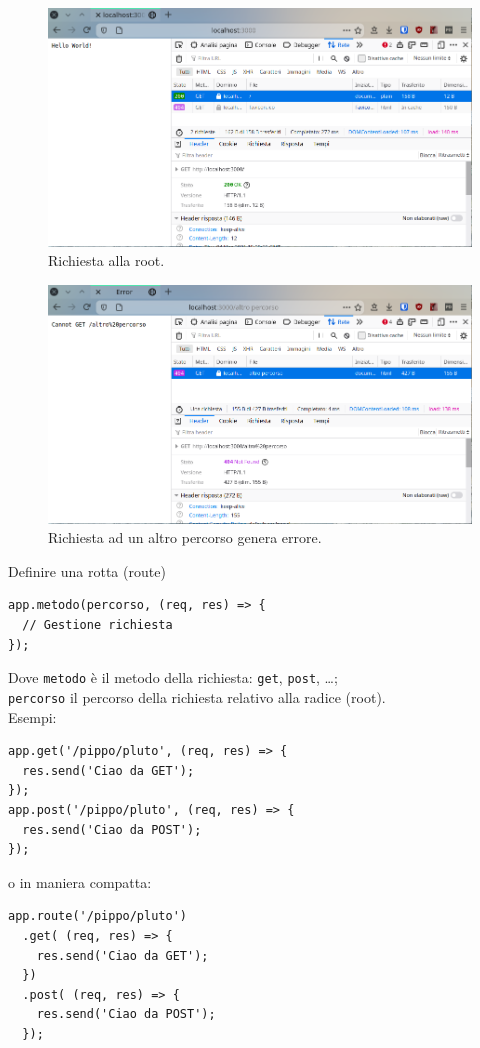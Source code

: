 \begin{frame}
  \begin{figure}
    \includegraphics[height=.8\paperheight]{img/node/200}
    \caption{Richiesta alla root.}
  \end{figure}
\end{frame}
\begin{frame}
  \begin{figure}
    \includegraphics[height=.8\paperheight]{img/node/404}
    \caption{Richiesta ad un altro percorso genera errore.}
  \end{figure}
\end{frame}

\begin{frame}[fragile]{Definire una rotta (route)}\transfade\centering
    \begin{verbatim}
app.metodo(percorso, (req, res) => {
  // Gestione richiesta
});
    \end{verbatim}
    Dove \texttt{metodo} è il metodo della richiesta: \texttt{get}, \texttt{post}, \dots;\\
    \texttt{percorso} il percorso della richiesta relativo alla radice (root).\\\bigskip\pause
    Esempi:
    \begin{verbatim}
app.get('/pippo/pluto', (req, res) => {
  res.send('Ciao da GET');
});
app.post('/pippo/pluto', (req, res) => {
  res.send('Ciao da POST');
});
    \end{verbatim}
    \pause o in maniera compatta:
    \begin{verbatim}
app.route('/pippo/pluto')
  .get( (req, res) => {
    res.send('Ciao da GET');
  })
  .post( (req, res) => {
    res.send('Ciao da POST');
  });
    \end{verbatim}
\end{frame}

